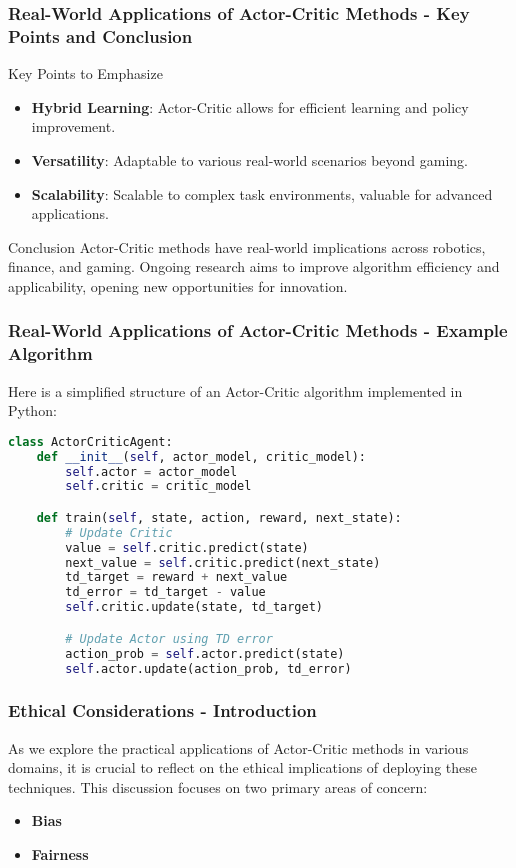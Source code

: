 \documentclass{beamer}
\begin{document}
\begin{frame}[fragile]
    \frametitle{Real-World Applications of Actor-Critic Methods - Key Points and Conclusion}
    \begin{block}{Key Points to Emphasize}
        \begin{itemize}
            \item \textbf{Hybrid Learning}: Actor-Critic allows for efficient learning and policy improvement.
            \item \textbf{Versatility}: Adaptable to various real-world scenarios beyond gaming.
            \item \textbf{Scalability}: Scalable to complex task environments, valuable for advanced applications.
        \end{itemize}
    \end{block}
    
    \begin{block}{Conclusion}
        Actor-Critic methods have real-world implications across robotics, finance, and gaming. Ongoing research aims to improve algorithm efficiency and applicability, opening new opportunities for innovation.
    \end{block}
\end{frame}

\begin{frame}[fragile]
    \frametitle{Real-World Applications of Actor-Critic Methods - Example Algorithm}
    Here is a simplified structure of an Actor-Critic algorithm implemented in Python:
    \begin{lstlisting}[language=Python]
class ActorCriticAgent:
    def __init__(self, actor_model, critic_model):
        self.actor = actor_model
        self.critic = critic_model

    def train(self, state, action, reward, next_state):
        # Update Critic
        value = self.critic.predict(state)
        next_value = self.critic.predict(next_state)
        td_target = reward + next_value
        td_error = td_target - value
        self.critic.update(state, td_target)

        # Update Actor using TD error
        action_prob = self.actor.predict(state)
        self.actor.update(action_prob, td_error)
    \end{lstlisting}
\end{frame}

\begin{frame}[fragile]
    \frametitle{Ethical Considerations - Introduction}
    As we explore the practical applications of Actor-Critic methods in various domains, it is crucial to reflect on the ethical implications of deploying these techniques. This discussion focuses on two primary areas of concern: 
    \begin{itemize}
        \item {\bf Bias}
        \item {\bf Fairness}
    \end{itemize}
\end{frame}
\end{document}
